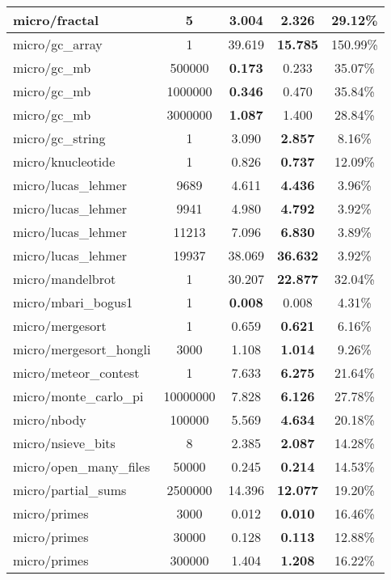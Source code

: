\begin{center}
\begin{longtable}{l|c|c|c|c}
  micro/fractal & 5 & 3.004 & \textbf{2.326} & 29.12\% \\ \hline
  micro/gc\_array & 1 & 39.619 & \textbf{15.785} & 150.99\% \\ \hline
  micro/gc\_mb & 500000 & \textbf{0.173} & 0.233 & 35.07\% \\ \hline
  micro/gc\_mb & 1000000 & \textbf{0.346} & 0.470 & 35.84\% \\ \hline
  micro/gc\_mb & 3000000 & \textbf{1.087} & 1.400 & 28.84\% \\ \hline
  micro/gc\_string & 1 & 3.090 & \textbf{2.857} & 8.16\% \\ \hline
  micro/knucleotide & 1 & 0.826 & \textbf{0.737} & 12.09\% \\ \hline
  micro/lucas\_lehmer & 9689 & 4.611 & \textbf{4.436} & 3.96\% \\ \hline
  micro/lucas\_lehmer & 9941 & 4.980 & \textbf{4.792} & 3.92\% \\ \hline
  micro/lucas\_lehmer & 11213 & 7.096 & \textbf{6.830} & 3.89\% \\ \hline
  micro/lucas\_lehmer & 19937 & 38.069 & \textbf{36.632} & 3.92\% \\ \hline
  micro/mandelbrot & 1 & 30.207 & \textbf{22.877} & 32.04\% \\ \hline
  micro/mbari\_bogus1 & 1 & \textbf{0.008} & 0.008 & 4.31\% \\ \hline
  micro/mergesort & 1 & 0.659 & \textbf{0.621} & 6.16\% \\ \hline
  micro/mergesort\_hongli & 3000 & 1.108 & \textbf{1.014} & 9.26\% \\ \hline
  micro/meteor\_contest & 1 & 7.633 & \textbf{6.275} & 21.64\% \\ \hline
  micro/monte\_carlo\_pi & 10000000 & 7.828 & \textbf{6.126} & 27.78\% \\ \hline
  micro/nbody & 100000 & 5.569 & \textbf{4.634} & 20.18\% \\ \hline
  micro/nsieve\_bits & 8 & 2.385 & \textbf{2.087} & 14.28\% \\ \hline
  micro/open\_many\_files & 50000 & 0.245 & \textbf{0.214} & 14.53\% \\ \hline
  micro/partial\_sums & 2500000 & 14.396 & \textbf{12.077} & 19.20\% \\ \hline
  micro/primes & 3000 & 0.012 & \textbf{0.010} & 16.46\% \\ \hline
  micro/primes & 30000 & 0.128 & \textbf{0.113} & 12.88\% \\ \hline
  micro/primes & 300000 & 1.404 & \textbf{1.208} & 16.22\% \\ \hline

\end{longtable}
\end{center}
